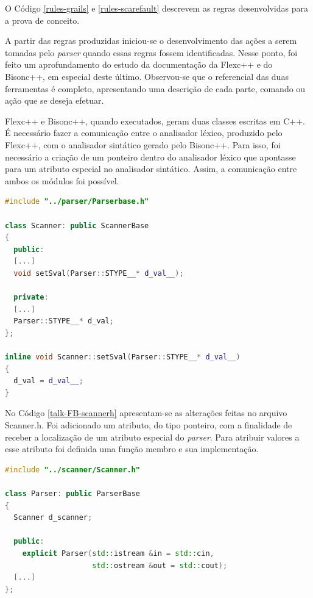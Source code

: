 \par
\indent O Código \ref{rules-grails} e \ref{rules-scarefault} descrevem as regras
desenvolvidas para a prova de conceito.
\par
\indent A partir das regras produzidas iniciou-se o desenvolvimento das ações a
serem tomadas pelo \textit{parser} quando essas regras fossem identificadas.
Nesse ponto, foi feito um aprofundamento do estudo da documentação da Flexc++ e
do Bisonc++, em especial deste último. Observou-se que o referencial das duas
ferramentas é completo, apresentando uma descrição de cada parte, comando ou
ação que se deseja efetuar.
\par
\indent Flexc++ e Bisonc++, quando executados, geram duas classes escritas em C++.
É necessário fazer a comunicação entre o analisador léxico, produzido pelo
Flexc++, com o analisador sintático gerado pelo Bisonc++. Para isso, foi
necessário a criação de um ponteiro dentro do analisador léxico que apontasse
para um atributo especial no analisador sintático. Assim, a comunicação entre
ambos os módulos foi possível.
\begin{lstlisting}[language=C++, label=talk-FB-scannerh, caption=Alterações no Scanner.h para comunicação entre Analisador Léxico e Sintático]
#include "../parser/Parserbase.h"

class Scanner: public ScannerBase
{
  public:
  [...]
  void setSval(Parser::STYPE__* d_val__);

  private:
  [...]
  Parser::STYPE__* d_val;
};

inline void Scanner::setSval(Parser::STYPE__* d_val__)
{
  d_val = d_val__;
}
\end{lstlisting}
\par
\indent No Código \ref{talk-FB-scannerh} apresentam-se as alterações feitas no
arquivo Scanner.h. Foi adicionado um atributo, do tipo ponteiro, com a finalidade
de receber a localização de um atributo especial do \textit{parser}. Para atribuir
valores a esse atributo foi definida uma função membro e sua implementação.
\par
\begin{lstlisting}[language=C++, label=talk-FB-parserh, caption=Alterações no Parser.h para comunicação entre Analisador Léxico e Sintático]
#include "../scanner/Scanner.h"

class Parser: public ParserBase
{
  Scanner d_scanner;

  public:
    explicit Parser(std::istream &in = std::cin,
                    std::ostream &out = std::cout);
  [...]
};

\end{lstlisting}
